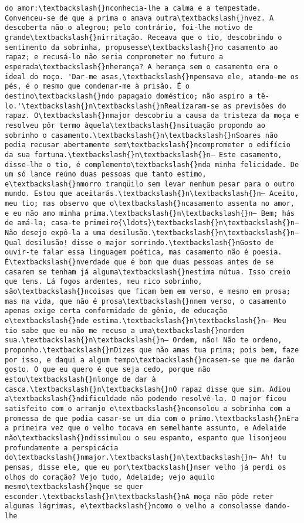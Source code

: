 \documentclass[11pt]{article}
\begin{document}
\begin{Verbatim}[commandchars=\\\{\}]
do amor:\textbackslash{}nconhecia-lhe a calma e a tempestade. Convenceu-se de que a prima o amava outra\textbackslash{}nvez. A descoberta não o alegrou; pelo contrário, foi-lhe motivo de grande\textbackslash{}nirritação. Receava que o tio, descobrindo o sentimento da sobrinha, propusesse\textbackslash{}no casamento ao rapaz; e recusá-lo não seria comprometer no futuro a esperada\textbackslash{}nherança? A herança sem o casamento era o ideal do moço. 'Dar-me asas,\textbackslash{}npensava ele, atando-me os pés, é o mesmo que condenar-me à prisão. É o destino\textbackslash{}ndo papagaio doméstico; não aspiro a tê-lo.'\textbackslash{}n\textbackslash{}nRealizaram-se as previsões do rapaz. O\textbackslash{}nmajor descobriu a causa da tristeza da moça e resolveu pôr termo àquela\textbackslash{}nsituação propondo ao sobrinho o casamento.\textbackslash{}n\textbackslash{}nSoares não podia recusar abertamente sem\textbackslash{}ncomprometer o edifício da sua fortuna.\textbackslash{}n\textbackslash{}n— Este casamento, disse-lhe o tio, é complemento\textbackslash{}nda minha felicidade. De um só lance reúno duas pessoas que tanto estimo, e\textbackslash{}nmorro tranqüilo sem levar nenhum pesar para o outro mundo. Estou que aceitarás.\textbackslash{}n\textbackslash{}n— Aceito, meu tio; mas observo que o\textbackslash{}ncasamento assenta no amor, e eu não amo minha prima.\textbackslash{}n\textbackslash{}n— Bem; hás de amá-la; casa-te primeiro{\ldots}\textbackslash{}n\textbackslash{}n— Não desejo expô-la a uma desilusão.\textbackslash{}n\textbackslash{}n— Qual desilusão! disse o major sorrindo.\textbackslash{}nGosto de ouvir-te falar essa linguagem poética, mas casamento não é poesia. É\textbackslash{}nverdade que é bom que duas pessoas antes de se casarem se tenham já alguma\textbackslash{}nestima mútua. Isso creio que tens. Lá fogos ardentes, meu rico sobrinho, são\textbackslash{}ncoisas que ficam bem em verso, e mesmo em prosa; mas na vida, que não é prosa\textbackslash{}nnem verso, o casamento apenas exige certa conformidade de gênio, de educação e\textbackslash{}nde estima.\textbackslash{}n\textbackslash{}n— Meu tio sabe que eu não me recuso a uma\textbackslash{}nordem sua.\textbackslash{}n\textbackslash{}n— Ordem, não! Não te ordeno, proponho.\textbackslash{}nDizes que não amas tua prima; pois bem, faze por isso, e daqui a algum tempo\textbackslash{}ncasem-se que me darão gosto. O que eu quero é que seja cedo, porque não estou\textbackslash{}nlonge de dar à casca.\textbackslash{}n\textbackslash{}nO rapaz disse que sim. Adiou a\textbackslash{}ndificuldade não podendo resolvê-la. O major ficou satisfeito com o arranjo e\textbackslash{}nconsolou a sobrinha com a promessa de que podia casar-se um dia com o primo.\textbackslash{}nEra a primeira vez que o velho tocava em semelhante assunto, e Adelaide não\textbackslash{}ndissimulou o seu espanto, espanto que lisonjeou profundamente a perspicácia do\textbackslash{}nmajor.\textbackslash{}n\textbackslash{}n— Ah! tu pensas, disse ele, que eu por\textbackslash{}nser velho já perdi os olhos do coração? Vejo tudo, Adelaide; vejo aquilo mesmo\textbackslash{}nque se quer esconder.\textbackslash{}n\textbackslash{}nA moça não pôde reter algumas lágrimas, e\textbackslash{}ncomo o velho a consolasse dando-lhe 
\end{Verbatim}
\end{document}
